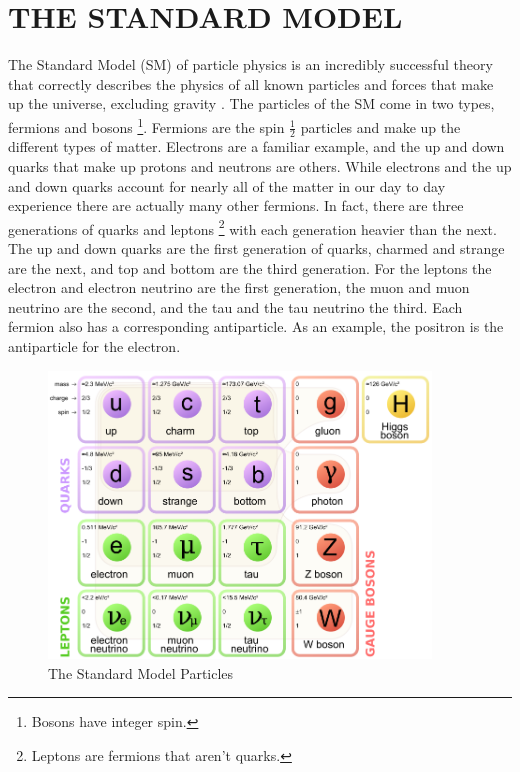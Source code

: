 \chapter{THE STANDARD MODEL} \label{sm}

The Standard Model (SM) of particle physics is an incredibly successful theory that correctly describes the physics of all known particles and forces that make up the universe, excluding gravity \cite{smconsistency}. The particles of the SM come in two types, fermions and bosons \footnote{Bosons have integer spin.}. Fermions are the spin $\frac{1}{2}$ particles and make up the different types of matter. Electrons are a familiar example, and the up and down quarks that make up protons and neutrons are others. While electrons and the up and down quarks account for nearly all of the matter in our day to day experience there are actually many other fermions. In fact, there are three generations of quarks and leptons \footnote{Leptons are fermions that aren't quarks.} with each generation heavier than the next. The up and down quarks are the first generation of quarks, charmed and strange are the next, and top and bottom are the third generation. For the leptons the electron and electron neutrino are the first generation, the muon and muon neutrino are the second, and the tau and the tau neutrino the third. Each fermion also has a corresponding antiparticle. As an example, the positron is the antiparticle for the electron. 

\begin{figure}[h!]
  \centering
  \includegraphics[width=4in]{images/Standard_Model_of_Elementary_Particles.png}
  \caption
   {The Standard Model Particles}
  \label{fig:smtable}
\end{figure}

